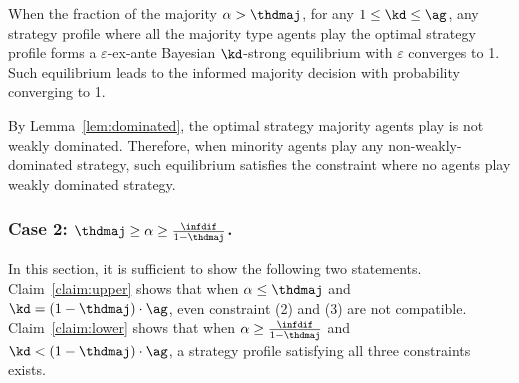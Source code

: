 \begin{coro}
\label{coro:extoacc}
    When the fraction of the majority $\alpha > \thdmaj$, for any $1 \le \kd \le \ag$, any strategy profile where all the majority type agents play the optimal strategy profile forms a $\varepsilon$-ex-ante Bayesian $\kd$-strong equilibrium with $\varepsilon$ converges to 1. Such equilibrium leads to the informed majority decision with probability converging to 1. 
\end{coro}

By Lemma~\ref{lem:dominated}, the optimal strategy majority agents play is not weakly dominated. Therefore, when minority agents play any non-weakly-dominated strategy, such equilibrium satisfies the constraint where no agents play weakly dominated strategy. 

\subsubsection{Case 2: $\thdmaj \ge \alpha \ge \frac{\infdif}{1 - \thdmaj}$.} In this section, it is sufficient to show the following two statements. Claim~\ref{claim:upper} shows that when $\alpha \le \thdmaj$ and $\kd = (1 - \thdmaj)\cdot \ag$, even constraint (2) and (3) are not compatible. Claim~\ref{claim:lower} shows that when $\alpha \ge \frac{\infdif}{1 - \thdmaj}$ and $\kd < (1 - \thdmaj)\cdot \ag$, a strategy profile satisfying all three constraints exists. 

